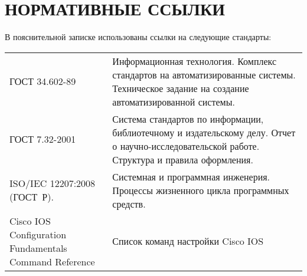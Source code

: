 \chapter*{НОРМАТИВНЫЕ ССЫЛКИ}

В пояснительной записке использованы ссылки на следующие стандарты:

\begin{table*}
	\begin{tabular}{p{}p{}}
		ГОСТ 34.602-89 & Информационная технология. Комплекс стандартов на автоматизированные системы. Техническое задание на создание автоматизированной системы.\\	
		
		
		ГОСТ 7.32-2001 &	Система стандартов по информации, библиотечному и издательскому делу. Отчет о научно-исследовательской работе. Структура и правила оформления.\\
		
		ISO/IEC 12207:2008 (ГОСТ~Р). & Системная и программная инженерия. Процессы жизненного цикла программных средств.\\
		
		Cisco IOS Con\-figuration Fundamentals Command Reference & Список команд настройки Cisco IOS\\
		
	\end{tabular}
	\label{tab:tabular}
\end{table*}